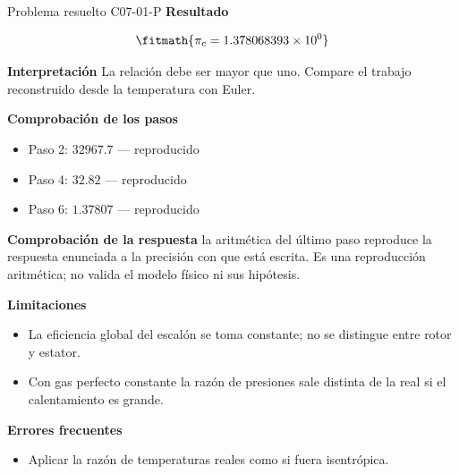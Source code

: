 \documentclass[10pt,openany]{book}
\begin{document}
\begin{studiumworked}{Problema resuelto C07-01-P}
\noindent\textbf{Resultado}

\[
\fitmath{\pi_c=1.378068393\times10^{0}}
\]

\noindent\textbf{Interpretación}
La relación debe ser mayor que uno. Compare el trabajo reconstruido desde la temperatura con Euler.

\noindent\textbf{Comprobación de los pasos}
\begin{itemize}
\item Paso 2: $32967.7$ — reproducido
\item Paso 4: $32.82$ — reproducido
\item Paso 6: $1.37807$ — reproducido
\end{itemize}

\noindent\textbf{Comprobación de la respuesta} la aritmética del último paso reproduce la respuesta enunciada a la precisión con que está escrita. Es una reproducción aritmética; no valida el modelo físico ni sus hipótesis.

\noindent\textbf{Limitaciones}
\begin{itemize}
\item La eficiencia global del escalón se toma constante; no se distingue entre rotor y estator.
\item Con gas perfecto constante la razón de presiones sale distinta de la real si el calentamiento es grande.
\end{itemize}

\noindent\textbf{Errores frecuentes}
\begin{itemize}
\item Aplicar la razón de temperaturas reales como si fuera isentrópica.
\end{itemize}
\end{studiumworked}
\end{document}
